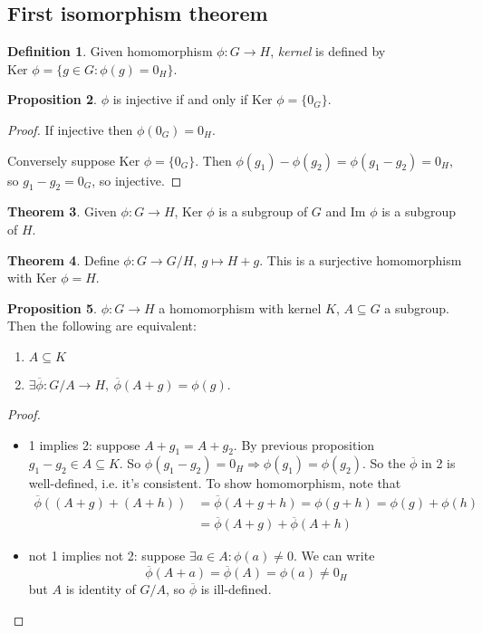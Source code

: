\documentclass[a4paper]{article}
\newcommand{\Ker}{\text{Ker }}
\theoremstyle{definition}
\newtheorem{defn}{Definition}[subsection]
\newtheorem{prop}[defn]{Proposition}
\newtheorem{thm}[defn]{Theorem}
\begin{document}
\subsection{First isomorphism theorem}
\begin{defn}
Given homomorphism $\phi:G\rightarrow H$, \textit{kernel} is defined by $\Ker \phi = \{g\in G:\phi(g)=0_H\}$.
\end{defn}
\begin{prop}
$\phi$ is injective if and only if $\Ker \phi = \{0_G\}$.
\end{prop}
\begin{proof}
If injective then $\phi (0_G)=0_H$.

Conversely suppose $\Ker \phi = \{0_G\}$. Then $\phi (g_1)-\phi (g_2) = \phi(g_1-g_2) = 0_H$, so $g_1-g_2=0_G$, so injective.
\end{proof}
\begin{thm}
Given $\phi:G\rightarrow H$, $\Ker \phi$ is a subgroup of $G$ and $\text{Im } \phi$ is a subgroup of $H.$
\end{thm}
\begin{thm}
Define $\phi : G\rightarrow G/H,\ g\mapsto H+g$. This is a surjective homomorphism with $\Ker \phi=H.$
\end{thm}
\begin{prop}
$\phi:G\rightarrow H$ a homomorphism with kernel $K$, $A\subseteq G$ a subgroup. Then the following are equivalent:
\begin{enumerate}
    \item $A\subseteq K$
    \item $\exists \overline{\phi}:G/A \rightarrow H,\ \overline{\phi} (A+g) = \phi (g).$
\end{enumerate}
\end{prop}
\begin{proof}
\begin{itemize}
    \item 1 implies 2: suppose $A+g_1=A+g_2$. By previous proposition $g_1-g_2 \in A \subseteq K$. So $\phi (g_1-g_2) = 0_H \Rightarrow \phi (g_1)=\phi(g_2).$ So the $\overline{\phi}$ in 2 is well-defined, i.e. it's consistent. To show homomorphism, note that
    \[
    \begin{aligned}
    \overline{\phi} ((A+g)+(A+h)) &= \overline{\phi} (A+g+h) = \phi (g+h) = \phi(g) + \phi(h) \\ &= \overline{\phi} (A+g)+\overline{\phi} (A+h)
    \end{aligned}
    \]
    \item not 1 implies not 2: suppose $\exists a \in A:\phi(a)\neq 0.$ We can write
    \[
    \overline{\phi} (A+a) = \overline{\phi} (A) = \phi(a) \neq 0_H
    \]
    but $A$ is identity of $G/A$, so $\overline{\phi}$ is ill-defined.
\end{itemize}
\end{proof}
\end{document}
